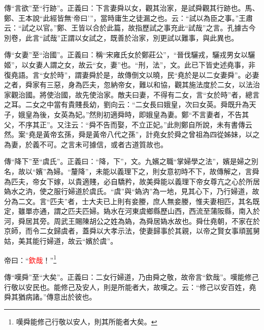 {\noindent\zhuan{}\fzbyks 傳“言欲”至“行跡”。正義曰：下言妻舜以女，觀其治家，是試舜觀其行跡也。馬、鄭、王本說“此經皆無‘帝曰’”，當時庸生之徒漏之也。云：“試以為臣之事。”王肅云：“試之以官。”鄭、王皆以合於此篇，故指歷試之事充此“試哉”之言。孔據古今別卷，此言“試哉”正謂以女試之，既善於治家，別更試以難事，與此異也。 \par}

{\noindent\zhuan{}\fzbyks 傳“女妻”至“治國”。正義曰：稱“宋雍氏女於鄭莊公”，“晉伐驪戎，驪戎男女以驪姬”，以女妻人謂之女，故云“女，妻”也。“刑，法”，文。此已下皆史述堯事，非復堯語。言“女於時”，謂妻舜於是，故傳倒文以曉，民“堯於是以二女妻舜”。必妻之者，舜家有三惡，身為匹夫，忽納帝女，難以和協，觀其施法度於二女，以法治家觀治國。將使治國，故先使治家。敵夫曰妻，不得有二女，言“女於時”者，總言之耳。二女之中當有貴賤長幼，劉向云：“二女長曰娥皇，次曰女英。舜既升為天子，娥皇為後，女英為妃。”然則初適舜時，即娥皇為妻。鄭“不言妻者，不告其父，不序其正”。又注云：“舜不告而娶，不立正妃。”此則鄭自所說，未有書傳云然。案“堯是黃帝玄孫，舜是黃帝八代之孫”，計堯女於舜之曾祖為四從姊妹，以之為妻，於義不可。之言未可據信，或者古道質故也。 \par}

{\noindent\zhuan{}\fzbyks 傳“降下”至“虞氏”。正義曰：“降，下”，文。九嬪之職“掌婦學之法”，嬪是婦之別名，故以“嬪”為婦。“釐降”，未能以義理下之，則女意初時不下，故傳解之，言舜為匹夫，帝女下嫁，以貴適賤，必自驕矜，故美舜能以義理下帝女尊亢之心於所居媯水之汭，使之服行婦道於虞氏。“虞”與“媯汭”為一地，見其心下，乃行婦道，故分為二文。言“匹夫”者，士大夫已上則有妾媵，庶人無妾媵，惟夫妻相匹，其名既定，雖單亦通，謂之匹夫匹婦。媯水在河東虞鄉縣歷山西，西流至蒲阪縣，南入於河，舜居其旁。周武王賜陳胡公之姓為媯，為舜居媯水故也。舜仕堯朝，不家在於京師，而令二女歸虞者，蓋舜以大孝示法，使妻歸事於其親，以帝之賢女事頑嚚舅姑，美其能行婦道，故云“嬪於虞”。 \par}

帝曰：“\textcolor{red}{欽哉}！”\footnote{嘆舜能修己行敬以安人，則其所能者大矣。}

{\noindent\zhuan{}\fzbyks 傳“嘆舜”至“大矣”。正義曰：二女行婦道，乃由舜之敬，故帝言“欽哉”。嘆能修己行敬以安民也。能修己及安人，則是所能者大，故嘆之。云：“修己以安百姓，堯舜其猶病諸。”傳意出於彼也。 \par}

